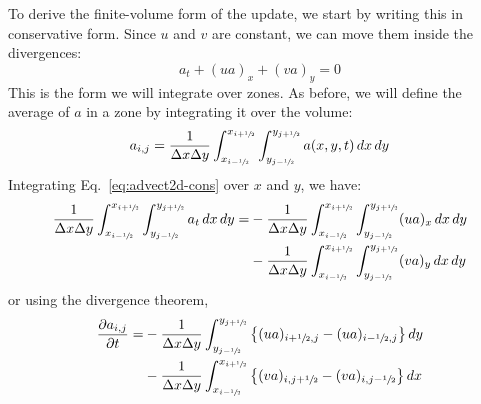 To derive the finite-volume form of the update, we start by writing
this in conservative form.  Since $u$ and $v$ are constant, we can
move them inside the divergences:
\begin{equation}
a_t + (u a)_x + (v a)_y = 0
\label{eq:advect2d-cons}
\end{equation}
This is the form we will integrate over zones.  As before, we will
define the average of $a$ in a zone by integrating it over the
volume:
\begin{equation}
a_{i,j} = \frac{1}{\Delta x \Delta y} 
   \int_{x_{i-{\sfrac{1}{2}}}}^{x_{i+{\sfrac{1}{2}}}} \int_{y_{j-{\sfrac{1}{2}}}}^{y_{j+{\sfrac{1}{2}}}} 
   a(x,y,t) \, dx \, dy
\end{equation}
Integrating Eq.~\ref{eq:advect2d-cons} over $x$ and $y$, we have:
\begin{align}
\frac{1}{\Delta x \Delta y} 
  \int_{x_{i-{\sfrac{1}{2}}}}^{x_{i+{\sfrac{1}{2}}}} 
  \int_{y_{j-{\sfrac{1}{2}}}}^{y_{j+{\sfrac{1}{2}}}} a_t \, dx \, dy =  
  &- \frac{1}{\Delta x \Delta y}
       \int_{x_{i-{\sfrac{1}{2}}}}^{x_{i+{\sfrac{1}{2}}}} \int_{y_{j-{\sfrac{1}{2}}}}^{y_{j+{\sfrac{1}{2}}}}
      (u a)_x \, dx \, dy \nonumber \\
  &- \frac{1}{\Delta x \Delta y}
       \int_{x_{i-{\sfrac{1}{2}}}}^{x_{i+{\sfrac{1}{2}}}} \int_{y_{j-{\sfrac{1}{2}}}}^{y_{j+{\sfrac{1}{2}}}}
      (v a)_y \, dx \, dy 
\end{align}
or using the divergence theorem,
\begin{align}
\label{eq:adv:multiddivergence}
 \frac{\partial a_{i,j}}{\partial t} =
  &- \frac{1}{\Delta x\Delta y} \int_{y_{j-{\sfrac{1}{2}}}}^{y_{j+{\sfrac{1}{2}}}}
     \left \{ (u a)_{i+{\sfrac{1}{2}},j} - (u a)_{i-{\sfrac{1}{2}},j} \right \} dy \nonumber \\
  &- \frac{1}{\Delta x\Delta y} \int_{x_{i-{\sfrac{1}{2}}}}^{x_{i+{\sfrac{1}{2}}}}
     \left \{ (v a)_{i,j+{\sfrac{1}{2}}} - (v a)_{i,j-{\sfrac{1}{2}}} \right \} dx
\end{align}

